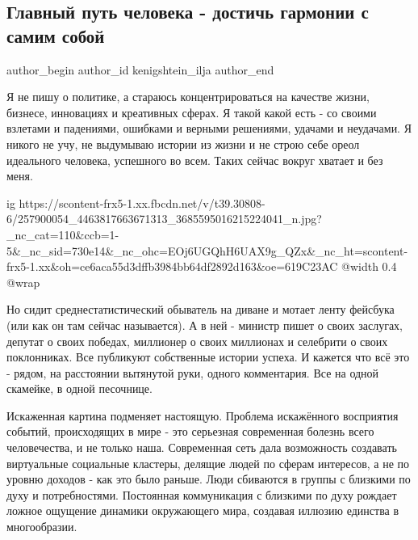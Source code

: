  
 
 
 
 
 
\subsection{Главный путь человека - достичь гармонии с самим собой}
\label{sec:18_11_2021.fb.kenigshtein_ilja.1.glavnyj_putj_cheloveka}
 
\ifcmt
 author_begin
   author_id kenigshtein_ilja
 author_end
\fi

Я не пишу о политике, а стараюсь концентрироваться на качестве жизни, бизнесе,
инновациях и креативных сферах. Я такой какой есть - со своими взлетами и
падениями, ошибками и верными решениями, удачами и неудачами. Я никого не учу,
не выдумываю истории из жизни и не строю себе ореол идеального человека,
успешного во всем. Таких сейчас вокруг хватает и без меня.

\ifcmt
  ig https://scontent-frx5-1.xx.fbcdn.net/v/t39.30808-6/257900054_4463817663671313_3685595016215224041_n.jpg?_nc_cat=110&ccb=1-5&_nc_sid=730e14&_nc_ohc=EOj6UGQhH6UAX9g_QZx&_nc_ht=scontent-frx5-1.xx&oh=ce6aca55d3dffb3984bb64df2892d163&oe=619C23AC
  @width 0.4
  @wrap 
\fi

Но сидит среднестатистический обыватель на диване и мотает ленту фейсбука (или
как он там сейчас называется). А в ней - министр пишет о своих заслугах,
депутат о своих победах, миллионер о своих миллионах и селебрити о своих
поклонниках. Все публикуют собственные истории успеха. И кажется что всё это -
рядом, на расстоянии вытянутой руки, одного комментария. Все на одной скамейке,
в одной песочнице. 

Искаженная картина подменяет настоящую. Проблема искажённого восприятия
событий, происходящих в мире - это серьезная современная болезнь всего
человечества, и не только наша. Современная сеть дала возможность создавать
виртуальные социальные кластеры, делящие людей по сферам интересов, а не по
уровню доходов - как это было раньше. Люди сбиваются в группы с близкими по
духу и потребностями. Постоянная коммуникация с близкими по духу рождает ложное
ощущение динамики окружающего мира, создавая иллюзию единства в многообразии. 

